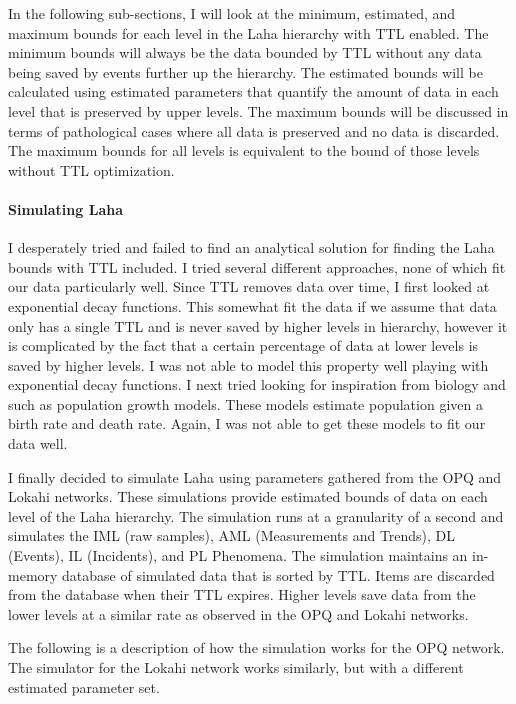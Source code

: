 In the following sub-sections, I will look at the minimum, estimated, and maximum bounds for each level in the Laha hierarchy with TTL enabled. The minimum bounds will always be the data bounded by TTL without any data being saved by events further up the hierarchy. The estimated bounds will be calculated using estimated parameters that quantify the amount of data in each level that is preserved by upper levels. The maximum bounds will be discussed in terms of pathological cases where all data is preserved and no data is discarded. The maximum bounds for all levels is equivalent to the bound of those levels without TTL optimization.

\paragraph{Simulating Laha}

I desperately tried and failed to find an analytical solution for finding the Laha bounds with TTL included. I tried several different approaches, none of which fit our data particularly well. Since TTL removes data over time, I first looked at exponential decay functions. This somewhat fit the data if we assume that data only has a single TTL and is never saved by higher levels in hierarchy, however it is complicated by the fact that a certain percentage of data at lower levels is saved by higher levels. I was not able to model this property well playing with exponential decay functions. I next tried looking for inspiration from biology and  such as population growth models. These models estimate population given a birth rate and death rate. Again, I was not able to get these models to fit our data well.

I finally decided to simulate Laha using parameters gathered from the OPQ and Lokahi networks. These simulations provide estimated bounds of data on each level of the Laha hierarchy. The simulation runs at a granularity of a second and simulates the IML (raw samples), AML (Measurements and Trends), DL (Events), IL (Incidents), and PL Phenomena. The simulation maintains an in-memory database of simulated data that is sorted by TTL. Items are discarded from the database when their TTL expires. Higher levels save data from the lower levels at a similar rate as observed in the OPQ and Lokahi networks.

The following is a description of how the simulation works for the OPQ network. The simulator for the Lokahi network works similarly, but with a different estimated parameter set.

